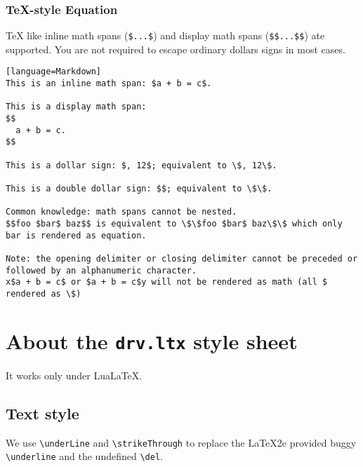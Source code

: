 \subsection{TeX-style Equation}
TeX like inline math spans (\verb!$...$!) and display math spans (\verb!$$...$$!) ate supported. You are not required to escape ordinary dollars signs in most cases.\par
\begin{verbatim}[language=Markdown]
This is an inline math span: $a + b = c$.

This is a display math span:
$$
  a + b = c.
$$

This is a dollar sign: $, 12$; equivalent to \$, 12\$.

This is a double dollar sign: $$; equivalent to \$\$.

Common knowledge: math spans cannot be nested.
$$foo $bar$ baz$$ is equivalent to \$\$foo $bar$ baz\$\$ which only bar is rendered as equation.

Note: the opening delimiter or closing delimiter cannot be preceded or followed by an alphanumeric character.
x$a + b = c$ or $a + b = c$y will not be rendered as math (all $ rendered as \$)
\end{verbatim}
\chapter{About the \texttt{drv.ltx} style sheet}
It works only under LuaLaTeX.\par
\section{Text style}
We use \verb!\underLine! and \verb!\strikeThrough! to replace the LaTeX2e provided buggy \verb!\underline! and the undefined \verb!\del!.\par
